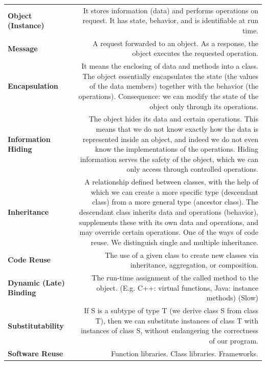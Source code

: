 \documentclass[margin=0px]{article}
\begin{document}
\begin{longtable}{L R}
\textbf{Object (Instance)} &
It stores information (data) and performs operations on request. It has state, behavior, and is identifiable at run time. \\[4pt]

\textbf{Message} &
A request forwarded to an object. As a response, the object executes the requested operation. \\[4pt]

\textbf{Encapsulation} &
It means the enclosing of data and methods into a class. The object essentially encapsulates the state (the values of the data members) together with the behavior (the operations). Consequence: we can modify the state of the object only through its operations. \\[4pt]

\textbf{Information Hiding} &
The object hides its data and certain operations. This means that we do not know exactly how the data is represented inside an object, and indeed we do not even know the implementations of the operations. Hiding information serves the safety of the object, which we can only access through controlled operations. \\[4pt]

\textbf{Inheritance} &
A relationship defined between classes, with the help of which we can create a more specific type (descendant class) from a more general type (ancestor class). The descendant class inherits data and operations (behavior), supplements these with its own data and operations, and may override certain operations. One of the ways of code reuse. We distinguish single and multiple inheritance. \\[4pt]

\textbf{Code Reuse} &
The use of a given class to create new classes via inheritance, aggregation, or composition. \\[4pt]

\textbf{Dynamic (Late) Binding} &
The run-time assignment of the called method to the object. (E.g. C++: virtual functions, Java: instance methods) (Slow) \\[4pt]

\textbf{Substitutability} &
If S is a subtype of type T (we derive class S from class T), then we can substitute instances of class T with instances of class S, without endangering the correctness of our program. \\[4pt]

\textbf{Software Reuse} &
Function libraries. Class libraries. Frameworks. \\[4pt]


\end{longtable}
\end{document}
